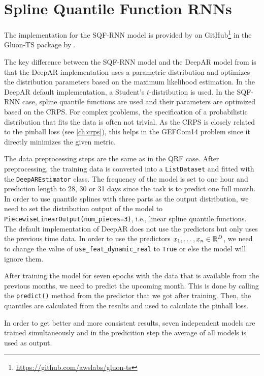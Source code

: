 \section{Spline Quantile Function RNNs}
\label{sec:implementation-sqf-rnn}

The implementation for the SQF-RNN model is provided by 
\Textcite{Gasthaus2019} on GitHub\footnote{\url{https://github.com/awslabs/gluon-ts}} in the 
Gluon-TS package by \Textcite{Alexandrov2019}.

The key difference between the SQF-RNN model and the DeepAR model from 
\Textcite{Salinas2017} is that the DeepAR implementation uses a 
parametric distribution and optimizes the distribution parameters 
based on the maximum likelihood estimation. 
In the DeepAR default implementation, a Student's \(t\)-distribution is used. 
In the SQF-RNN case, spline quantile functions are used and their parameters 
are optimized based on the CRPS. 
For complex problems, the specification of a probabilistic distribution 
that fits the data is often not trivial. 
As the CRPS is closely related to the pinball loss (see \ref{ch:crps}), 
this helps in the GEFCom14 problem since it directly minimizes the given metric.

The data preprocessing steps are the same as in the QRF case. 
After preprocessing, the training data is converted into a \texttt{ListDataset} and fitted with the 
\texttt{DeepAREstimator} class. The frequency of the model is set to one hour and 
prediction length to 28, 30 or 31 days since the task is to predict one full month. 
In order to use quantile splines with three parts as the output distribution, 
we need to set the distribution output of the model to \texttt{PiecewiseLinearOutput(num\_pieces=3)}, 
i.e., linear spline quantile functions. 
The default implementation of DeepAR does not use the predictors but only uses the previous time data. 
In order to use the predictors \(x_1, \ldots, x_n \in \mathbb{R}^D\), 
we need to change the value of \texttt{use\_feat\_dynamic\_real}
to \texttt{True} or else the model will ignore them. 

After training the model for seven epochs with the data that is available from the previous months, 
we need to predict the upcoming month. This is done by calling the \texttt{predict()} 
method from the predictor that we got after training.
Then, the quantiles are calculated from the results and used to 
calculate the pinball loss.

In order to get better and more consistent results, 
seven independent models are trained simultaneously and in the predicition step the average of all models is used as output.

